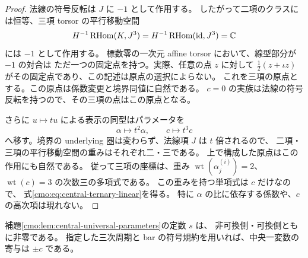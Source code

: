 \begin{proof}
法線の符号反転は $J$ に $-1$ として作用する。
したがって二項のクラスには恒等、三項 torsor の平行移動空間
\[
 H^{-1}\operatorname{RHom}(K,J^3)
   =H^{-1}\operatorname{RHom}(\operatorname{id},J^3)
   =\mathbb C
\]
には $-1$ として作用する。
標数零の一次元 affine torsor において、線型部分が $-1$ の対合は
ただ一つの固定点を持つ。実際、任意の点 $z$ に対して
$\frac12(z+\iota z)$ がその固定点であり、この記述は原点の選択によらない。
これを三項の原点とする。この原点は係数変更と境界同値に自然である。
$c=0$ の実族は法線の符号反転を持つので、その三項の点はこの原点となる。

さらに $u\mapsto t u$ による表示の同型はパラメータを
\[
 \alpha\longmapsto t^2\alpha,\qquad c\longmapsto t^3c
\]
へ移す。境界の underlying 圏は変わらず、法線項 $J$ は $t$ 倍されるので、
二項・三項の平行移動空間の重みはそれぞれ二・三である。
上で構成した原点はこの作用にも自然である。
従って三項の座標は、重み
$\operatorname{wt}(\alpha_j^{(i)})=2$、$\operatorname{wt}(c)=3$
の次数三の多項式である。
この重みを持つ単項式は $c$ だけなので、
式\eqref{cmo:eq:central-ternary-linear}を得る。
特に $\alpha$ の比に依存する係数や、$c$ の高次項は現れない。
\end{proof}

\begin{lemma}[三項の中心係数は非零]\label{cmo:lem:central-ternary-nonzero}
補題\ref{cmo:lem:central-universal-parameters}の定数 $s$ は、
非可換側・可換側ともに非零である。
指定した三次周期と bar の符号規約を用いれば、中央一変数の寄与は $\pm c$ である。
\end{lemma}

